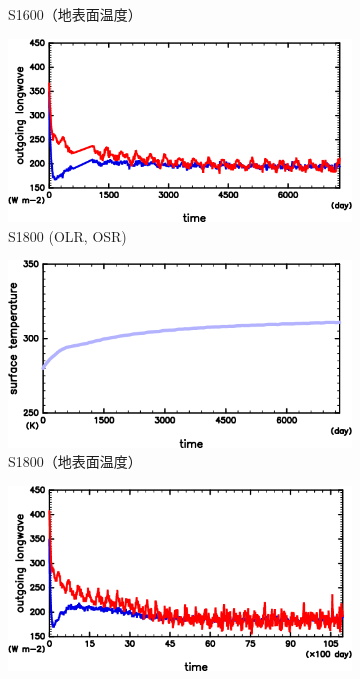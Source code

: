 \documentclass[body]{subfiles}
\begin{document}
\begin{figure}[t]
\begin{subfigure}{.4\textwidth}
		\caption{S1600（地表面温度）}\label{S1600_SurfTemp}
	\end{subfigure}
	\begin{subfigure}{.4\textwidth}
		\centering
		\includegraphics[width=\textwidth]{S1800/S1800_OLRA-OSRA_horimean_time0.0-7300.0-crop.png}
		\caption{S1800 (OLR, OSR)}\label{S1800_OLRA}
	\end{subfigure}
	\begin{subfigure}{.4\textwidth}
		\centering
		\includegraphics[width=\textwidth]{S1800/S1800_SurfTemp_horimean_time0.0-7300.0-crop.png}
		\caption{S1800（地表面温度）}\label{S1800_SurfTemp}
	\end{subfigure}
	\begin{subfigure}{.4\textwidth}
		\centering
		\includegraphics[width=\textwidth]{S2000/S2000_OLRA-OSRA_horimean_time0.0-10950.0-crop.png}

\end{subfigure}
\end{figure}
\end{document}
